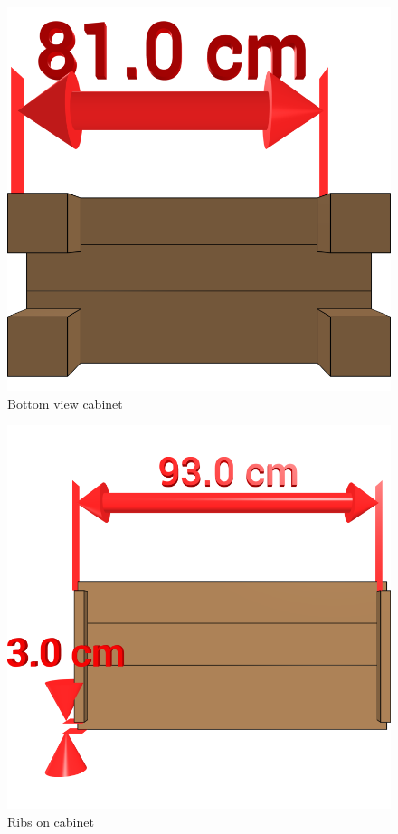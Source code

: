 \documentclass{article}
\begin{document}
\begin{figure}[h!]
    \centering
    \includegraphics[width=\textwidth]{scene 1 - bottom.png}
    \caption{Bottom view cabinet}
\end{figure}

\begin{figure}[h!]
    \centering
    \includegraphics[width=\textwidth]{scene 2 - bottom rib.png}
    \caption{Ribs on cabinet}
\end{figure}
\end{document}
